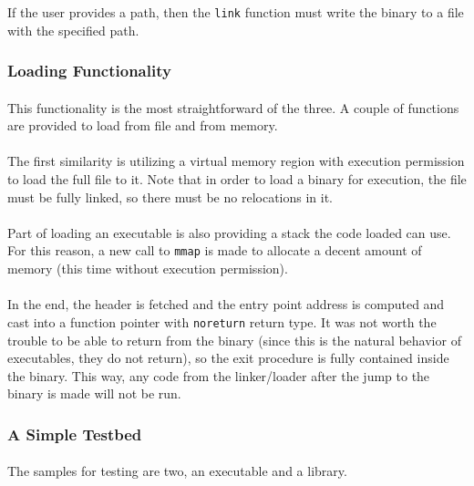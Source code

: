 \documentclass[12pt]{article}
\begin{document}
	If the user provides a path, then the \verb|link| function must write the binary to a file with the specified path.
	
	\subsubsection{Loading Functionality}
	\paragraph{}This functionality is the most straightforward of the three. A couple of functions are provided to load from file and from memory.
	\paragraph{}The first similarity is utilizing a virtual memory region with execution permission to load the full file to it. Note that in order to load a binary for execution, the file must be fully linked, so there must be no relocations in it.
	\paragraph{}Part of loading an executable is also providing a stack the code loaded can use. For this reason, a new call to \verb|mmap| is made to allocate a decent amount of memory (this time without execution permission).
	\paragraph{}In the end, the header is fetched and the entry point address is computed and cast into a function pointer with \verb|noreturn| return type. It was not worth the trouble to be able to return from the binary (since this is the natural behavior of executables, they do not return), so the exit procedure is fully contained inside the binary. This way, any code from the linker/loader after the jump to the binary is made will not be run.
	
	\subsubsection{A Simple Testbed}
	\paragraph{}The samples for testing are two, an executable and a library.
\end{document}
